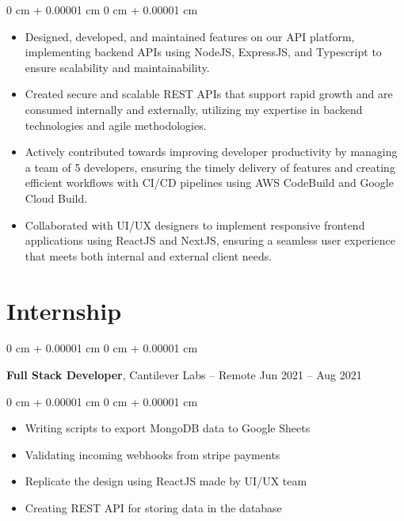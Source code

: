 \documentclass[10pt, letterpaper]{article}
\newenvironment{highlights}{
    \begin{itemize}[
        topsep=0.10 cm,
        parsep=0.10 cm,
        partopsep=0pt,
        itemsep=0pt,
        leftmargin=0 cm + 10pt
    ]
}{
    \end{itemize}
} %
\newenvironment{onecolentry}{
    \begin{adjustwidth}{
        0 cm + 0.00001 cm
    }{
        0 cm + 0.00001 cm
    }
}{
    \end{adjustwidth}
} %
\newenvironment{twocolentry}[2][]{
    \onecolentry
    \def\secondColumn{#2}
    \setcolumnwidth{\fill, 4.5 cm}
    \begin{paracol}{2}
}{
    \switchcolumn \raggedleft \secondColumn
    \end{paracol}
    \endonecolentry
} %
\begin{document}
        \vspace{0.10 cm}
        \begin{onecolentry}
            \begin{highlights}
\item Designed, developed, and maintained features on our API platform, implementing backend APIs using NodeJS, ExpressJS, and Typescript to ensure scalability and maintainability.
\item Created secure and scalable REST APIs that support rapid growth and are consumed internally and externally, utilizing my expertise in backend technologies and agile methodologies.
\item Actively contributed towards improving developer productivity by managing a team of 5 developers, ensuring the timely delivery of features and creating efficient workflows with CI/CD pipelines using AWS CodeBuild and Google Cloud Build.
\item Collaborated with UI/UX designers to implement responsive frontend applications using ReactJS and NextJS, ensuring a seamless user experience that meets both internal and external client needs.
            \end{highlights}
        \end{onecolentry}


        \vspace{0.2 cm}


    \section{Internship}



        
        \begin{twocolentry}{
            Jun 2021 – Aug 2021
        }
            \textbf{Full Stack Developer}, Cantilever Labs -- Remote\end{twocolentry}

        \vspace{0.10 cm}
        \begin{onecolentry}
            \begin{highlights}
                \item Writing scripts to export MongoDB data to Google Sheets
                \item Validating incoming webhooks from stripe payments
                \item Replicate the design using ReactJS made by UI/UX team 
                \item Creating REST API for storing data in the database
            \end{highlights}
        \end{onecolentry}
\end{document}
